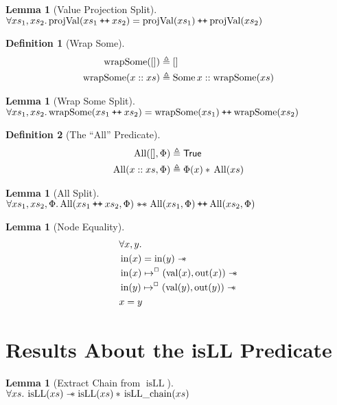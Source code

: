 \documentclass[a4paper, 10pt]{report}
\theoremstyle{definition}
\newtheorem{lemma}[theorem]{Lemma}
\newtheorem{definition}{Definition}[section]
\newcommand{\isLLchain}{\operatorname{isLL\_chain}}
\newcommand{\isLL}{\operatorname{isLL}}
\newcommand{\AllP}{\operatorname{All}}
\newcommand{\projval}{\operatorname{projVal}}
\newcommand{\wrapsome}{\operatorname{wrapSome}}
\newcommand{\nIn}[1]{\operatorname{in}(#1)}
\newcommand{\nVal}[1]{\operatorname{val}(#1)}
\newcommand{\nOut}[1]{\operatorname{out}(#1)}
\newcommand\catenate{\mathbin{\text{\ttfamily\upshape ++}}}
\newcommand{\isNode}[1]{\nIn{#1} \mapsto^{\persistently} (\nVal{#1}, \nOut{#1})}
\begin{document}
\begin{lemma}[Value Projection Split]\label{lemma:value-proj-split}
  $\All xs_1, xs_2.\\
  \projval(xs_1 \catenate xs_2) = \projval(xs_1) \catenate \projval(xs_2)$
\end{lemma}

\begin{definition}[Wrap Some]\label{COMMON:Def:wrap-some}
  \begin{align*}
    \wrapsome([]) &\eqdef []\\
    \wrapsome(x :: xs) &\eqdef \Some{x} :: \wrapsome(xs)
  \end{align*}
\end{definition}

\begin{lemma}[Wrap Some Split]\label{lemma:wrap-some-split}
  $\All xs_1, xs_2.\\
  \wrapsome(xs_1 \catenate xs_2) = \wrapsome(xs_1) \catenate \wrapsome(xs_2)$
\end{lemma}


\begin{definition}[The ``All'' Predicate]\label{COMMON:Def:All}
  \begin{align*}
    \AllP([], \Phi) &\eqdef \TRUE\\
    \AllP(x :: xs, \Phi) &\eqdef \Phi(x) \star{} \AllP(xs)
  \end{align*}
\end{definition}

\begin{lemma}[All Split]\label{lemma:all-split}
  $\All xs_1, xs_2, \Phi.\\
  \AllP(xs_1 \catenate xs_2, \Phi) \wandIff \AllP(xs_1, \Phi) \catenate \AllP(xs_2, \Phi)$
\end{lemma}


\begin{lemma}[Node Equality]\label{lemma:nIn-equal}
  \begin{align*}
    &\All x, y.\\
    &\nIn{x} = \nIn{y} \wand\\
    &\isNode{x} \wand\\
    &\isNode{y} \wand\\
    &x = y
  \end{align*}
\end{lemma}

\section{Results About the isLL Predicate}\label{appendix:common:section:isll}
\begin{lemma}[Extract Chain from $\isLL$]\label{lemma:isLL-and-chain}
  $\All xs. \isLL(xs) \wand \isLL(xs) \star{} \isLLchain(xs)$
\end{lemma}
\end{document}
